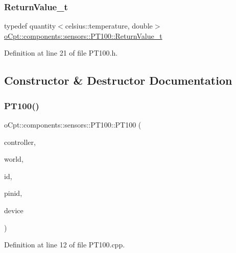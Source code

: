 \subsubsection{\texorpdfstring{Return\+Value\+\_\+t}{ReturnValue\_t}}
{\footnotesize\ttfamily typedef quantity$<$celsius\+::temperature, double$>$ \hyperlink{classo_cpt_1_1components_1_1sensors_1_1_p_t100_a46c281d97bd4bd34e16f486a6aeda82e}{o\+Cpt\+::components\+::sensors\+::\+P\+T100\+::\+Return\+Value\+\_\+t}}



Definition at line 21 of file P\+T100.\+h.



\subsection{Constructor \& Destructor Documentation}
\hypertarget{classo_cpt_1_1components_1_1sensors_1_1_p_t100_aedb71224bcffefd6d43ee72458344826}{}\label{classo_cpt_1_1components_1_1sensors_1_1_p_t100_aedb71224bcffefd6d43ee72458344826} 
\subsubsection{\texorpdfstring{P\+T100()}{PT100()}}
{\footnotesize\ttfamily o\+Cpt\+::components\+::sensors\+::\+P\+T100\+::\+P\+T100 (\begin{DoxyParamCaption}\item[{\hyperlink{classo_cpt_1_1i_controller_a6d89a95cd6ad68bb74adfaca2f36370f}{i\+Controller\+::ptr}}]{controller,  }\item[{\hyperlink{classo_cpt_1_1_world_aa6e591e3096d5de71e0cec9039663d67}{World\+::ptr}}]{world,  }\item[{std\+::string}]{id,  }\item[{uint8\+\_\+t}]{pinid,  }\item[{uint8\+\_\+t}]{device }\end{DoxyParamCaption})}



Definition at line 12 of file P\+T100.\+cpp.

\hypertarget{classo_cpt_1_1components_1_1sensors_1_1_p_t100_aa6fcce0276d47e75a16f153962c57b8c}{}\label{classo_cpt_1_1components_1_1sensors_1_1_p_t100_aa6fcce0276d47e75a16f153962c57b8c} 
